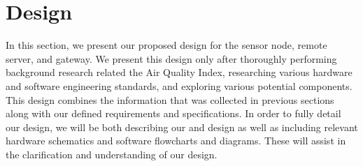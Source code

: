 \section{Design}
In this section, we present our proposed design for the sensor node, remote server, and gateway. We present this design only after thoroughly performing background research related the Air Quality Index, researching various hardware and software engineering standards, and exploring various potential components. This design combines the information that was collected in previous sections along with our defined requirements and specifications. In order to fully detail our design, we will be both describing our and design as well as including relevant hardware schematics and software flowcharts and diagrams. These will assist in the clarification and understanding of our design.



